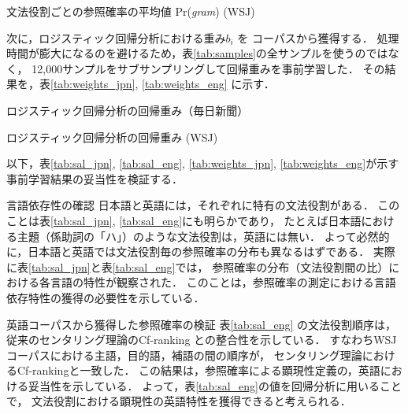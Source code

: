 \documentclass[japanese]{jnlp_1.3e}
\renewcommand{\paragraph}{}
\begin{document}
\begin{table}[t]
\caption{文法役割ごとの参照確率の平均値 Pr({\it gram}) (WSJ)}
\label{tab:sal_eng}

\end{table}


次に，ロジスティック回帰分析における重み$b_i$ を
コーパスから獲得する．
処理時間が膨大になるのを避けるため，表\ref{tab:samples}の全サンプルを使うのではなく，
12,000サンプルをサブサンプリングして回帰重みを事前学習した．
その結果を，表\ref{tab:weights_jpn}, \ref{tab:weights_eng} に示す．

\begin{table}[t]
\begin{minipage}[t]{.5\textwidth}
\caption{ロジスティック回帰分析の回帰重み（毎日新聞）}
\label{tab:weights_jpn}

\end{minipage}
\hfill
\begin{minipage}[t]{.47\textwidth}
\caption{ロジスティック回帰分析の回帰重み (WSJ)}
\label{tab:weights_eng}

\end{minipage}
\end{table}


以下，表\ref{tab:sal_jpn}, \ref{tab:sal_eng}, \ref{tab:weights_jpn}, \ref{tab:weights_eng}が示す事前学習結果の妥当性を検証する．


\paragraph{言語依存性の確認}
日本語と英語には，それぞれに特有の文法役割がある．
このことは表\ref{tab:sal_jpn}, \ref{tab:sal_eng}にも明らかであり，
たとえば日本語における主題（係助詞の「ハ」）のような文法役割は，英語には無い．
よって必然的に，日本語と英語では文法役割毎の参照確率の分布も異なるはずである．
実際に表\ref{tab:sal_jpn}と表\ref{tab:sal_eng}では，
参照確率の分布（文法役割間の比）における各言語の特性が観察された．
このことは，参照確率の測定における言語依存特性の獲得の必要性を示している．

\paragraph{英語コーパスから獲得した参照確率の検証}
表\ref{tab:sal_eng} の文法役割順序は，
従来のセンタリング理論のCf-ranking との整合性を示している．
すなわちWSJコーパスにおける主語，目的語，補語の間の順序が，
センタリング理論におけるCf-rankingと一致した．
この結果は，参照確率による顕現性定義の，英語における妥当性を示している．
よって，表\ref{tab:sal_eng}の値を回帰分析に用いることで，
文法役割における顕現性の英語特性を獲得できると考えられる．
\end{document}
